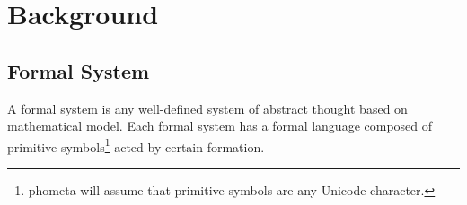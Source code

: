 \documentclass[master.tex]{subfiles}
\begin{document}
\chapter{Background}

\section{Formal System}

A formal system is any well-defined system of abstract thought based on mathematical model\supercite{formal-system-wiki}. Each formal system has a formal language composed of primitive symbols\footnote{phometa will assume that primitive symbols are any Unicode character.} acted by certain formation\supercite{formal-system-britannica}.








\end{document}
